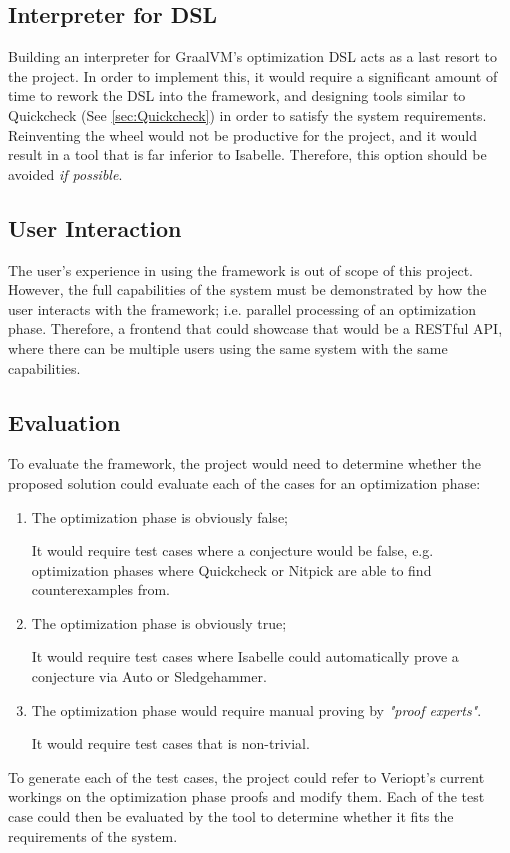 \subsection{Interpreter for DSL}
\label{sec:DSLInterpreter}

Building an interpreter for GraalVM's optimization DSL acts as a last resort to the project. In order to implement this, it would require a significant 
amount of time to rework the DSL into the framework, and designing tools similar to Quickcheck (See \ref{sec:Quickcheck}) in order to satisfy the 
system requirements. Reinventing the wheel would not be productive for the project, and it would result in a tool that is far inferior to Isabelle.
Therefore, this option should be avoided \emph{if possible}.

\pagebreak

\subsection{User Interaction}

The user's experience in using the framework is out of scope of this project. However, the full capabilities of the system must be demonstrated 
by how the user interacts with the framework; i.e. parallel processing of an optimization phase. Therefore, a frontend that could showcase that would 
be a RESTful API, where there can be multiple users using the same system with the same capabilities.

\subsection{Evaluation}

To evaluate the framework, the project would need to determine whether the proposed solution could evaluate each of the cases for an optimization phase:

\begin{enumerate}
      \item The optimization phase is obviously false;
      
            It would require test cases where a conjecture would be false, e.g. optimization phases where Quickcheck or Nitpick are able to find 
            counterexamples from.
  
      \item The optimization phase is obviously true;
      
            It would require test cases where Isabelle could automatically prove a conjecture via Auto or Sledgehammer.
  
      \item The optimization phase would require manual proving by \emph{"proof experts"}.
            
            It would require test cases that is non-trivial.
  
  \end{enumerate}

To generate each of the test cases, the project could refer to Veriopt's current workings on the optimization phase proofs and modify them. Each of the 
test case could then be evaluated by the tool to determine whether it fits the requirements of the system.